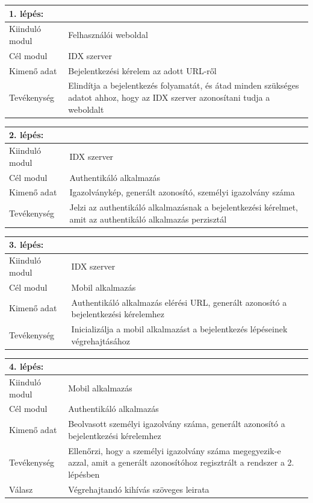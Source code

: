 \begin{tabular}{|p{3cm}|p{10cm} |}
   	\hline
	\textbf{1. lépés:} & \textbf{}\\ \hline
	Kiinduló modul & Felhasználói weboldal \\ \hline
	Cél modul & IDX szerver \\ \hline
	Kimenő adat & Bejelentkezési kérelem az adott URL-ről \\ \hline
	Tevékenység & Elindítja a bejelentkezés folyamatát, és átad minden szükséges adatot ahhoz, hogy az IDX szerver azonosítani tudja a weboldalt \\ \hline
\end{tabular}


\begin{tabular}{|p{3cm}|p{10cm} |}
   	\hline
	\textbf{2. lépés:} & \textbf{}\\ \hline
	Kiinduló modul & IDX szerver \\ \hline
	Cél modul & Authentikáló alkalmazás \\ \hline
	Kimenő adat & Igazolványkép, generált azonosító, személyi igazolvány száma \\ \hline
	Tevékenység & Jelzi az authentikáló alkalmazásnak a bejelentkezési kérelmet, amit az authentikáló alkalmazás perzisztál\\ \hline
\end{tabular}


\begin{tabular}{|p{3cm}|p{10cm} |}
   	\hline
	\textbf{3. lépés:} & \textbf{}\\ \hline
	Kiinduló modul & IDX szerver \\ \hline
	Cél modul & Mobil alkalmazás \\ \hline
	Kimenő adat & Authentikáló alkalmazás elérési URL, generált azonosító a bejelentkezési kérelemhez \\ \hline
	Tevékenység & Inicializálja a mobil alkalmazást a bejelentkezés lépéseinek végrehajtásához\\ \hline
\end{tabular}

\begin{tabular}{|p{3cm}|p{10cm} |}
   	\hline
	\textbf{4. lépés:} & \textbf{}\\ \hline
	Kiinduló modul & Mobil alkalmazás \\ \hline
	Cél modul & Authentikáló alkalmazás \\ \hline
	Kimenő adat & Beolvasott személyi igazolvány száma, generált azonosító a bejelentkezési kérelemhez \\ \hline
	Tevékenység & Ellenőrzi, hogy a személyi igazolvány száma megegyezik-e azzal, amit a generált azonosítóhoz regisztrált a rendszer  a 2. lépésben\\ \hline
	Válasz & Végrehajtandó kihívás szöveges leirata\\ \hline
\end{tabular}


